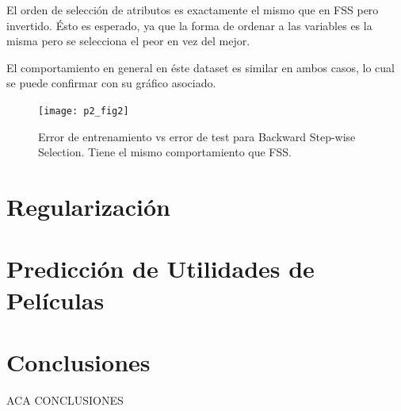 \documentclass[letter, 10pt]{article}
\begin{document}
El orden de selección de atributos es exactamente el mismo que en FSS pero
invertido. Ésto es esperado, ya que la forma de ordenar a las variables es la
misma pero se selecciona el peor en vez del mejor.

El comportamiento en general en éste dataset es similar en ambos casos, lo cual
se puede confirmar con su gráfico asociado.

\begin{figure}[H]
  \centering
 \texttt{[image: p2\_fig2]} 
  \caption{Error de entrenamiento vs error de test para Backward Step-wise
    Selection. Tiene el mismo comportamiento que FSS.}
  \label{fig:p2_g2}
\end{figure}
\section{Regularización}

\section{Predicción de Utilidades de Películas}

\section{Conclusiones}

ACA CONCLUSIONES



\end{document}
